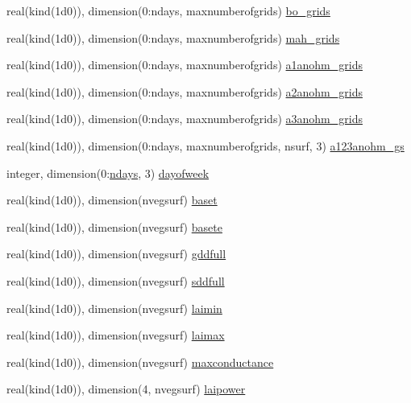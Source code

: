 \begin{DoxyCompactItemize}
\item 
real(kind(1d0)), dimension(0\+:ndays, maxnumberofgrids) \hyperlink{namespaceallocatearray_ace47843655c90683e7e9d552fe6d16df}{bo\+\_\+grids}
\item 
real(kind(1d0)), dimension(0\+:ndays, maxnumberofgrids) \hyperlink{namespaceallocatearray_a3726b9b257444736e7319b5fe72dbb90}{mah\+\_\+grids}
\item 
real(kind(1d0)), dimension(0\+:ndays, maxnumberofgrids) \hyperlink{namespaceallocatearray_a7ee45a16de162e892800412aaf12860f}{a1anohm\+\_\+grids}
\item 
real(kind(1d0)), dimension(0\+:ndays, maxnumberofgrids) \hyperlink{namespaceallocatearray_acf7a96adc3b69c60d4ce6e7dfc650d84}{a2anohm\+\_\+grids}
\item 
real(kind(1d0)), dimension(0\+:ndays, maxnumberofgrids) \hyperlink{namespaceallocatearray_a2b748c97acf1e59645afb30c49a9ef9a}{a3anohm\+\_\+grids}
\item 
real(kind(1d0)), dimension(0\+:ndays, maxnumberofgrids, nsurf, 3) \hyperlink{namespaceallocatearray_a90def3338a21c4f1e7411ed20b48521f}{a123anohm\+\_\+gs}
\item 
integer, dimension(0\+:\hyperlink{namespaceallocatearray_ad1f75258d3afd41ea7c941d35561665b}{ndays}, 3) \hyperlink{namespaceallocatearray_a7bc9ecd33459d391cf70ea0bb83dce0f}{dayofweek}
\item 
real(kind(1d0)), dimension(nvegsurf) \hyperlink{namespaceallocatearray_a49f3ef4737336da78b6aaacae1084644}{baset}
\item 
real(kind(1d0)), dimension(nvegsurf) \hyperlink{namespaceallocatearray_a25e6bb019be7fb8c46aa2c0b067ff289}{basete}
\item 
real(kind(1d0)), dimension(nvegsurf) \hyperlink{namespaceallocatearray_ae49dddcd41fe5e50e947da3ecdfeae49}{gddfull}
\item 
real(kind(1d0)), dimension(nvegsurf) \hyperlink{namespaceallocatearray_ab1f90daea4da5dc0660d0ce9aec88a4a}{sddfull}
\item 
real(kind(1d0)), dimension(nvegsurf) \hyperlink{namespaceallocatearray_ab3f65c4c4c46b200d0e63121b457d7c4}{laimin}
\item 
real(kind(1d0)), dimension(nvegsurf) \hyperlink{namespaceallocatearray_a535874e25b1042564b17301e8d84147b}{laimax}
\item 
real(kind(1d0)), dimension(nvegsurf) \hyperlink{namespaceallocatearray_aded55272c7c08e6a254c7a9d70546d69}{maxconductance}
\item 
real(kind(1d0)), dimension(4, nvegsurf) \hyperlink{namespaceallocatearray_a223428e8ad63f23758c195a04032b6cc}{laipower}

\end{DoxyCompactItemize}
